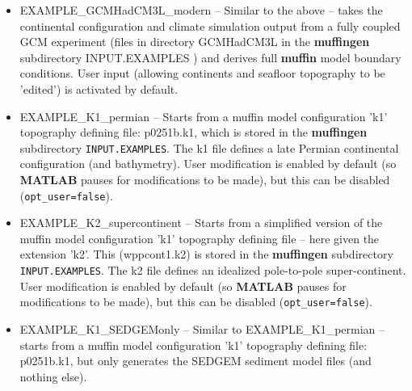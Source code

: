 \documentclass[11pt,fleqn]{book} %
\begin{document}
\begin{itemize}[noitemsep]
\vspace{1mm}
\item \textsf{\footnotesize EXAMPLE\_GCMHadCM3L\_modern} -- Similar to the above -- takes the continental configuration and climate simulation output from a fully coupled GCM experiment (files in directory \footnotesize\textsf{GCMHadCM3L }\normalsize in the \textbf{muffingen} subdirectory \footnotesize\textsf{INPUT.EXAMPLES }\normalsize) and derives full \textbf{muffin} model boundary conditions. User input (allowing continents and seafloor topography to be 'edited') is activated by default.

\vspace{1mm}
\item \textsf{\footnotesize EXAMPLE\_K1\_permian} -- Starts from a muffin model configuration 'k1' topography defining file: \textsf{\footnotesize p0251b.k1}, which is stored in the \textbf{muffingen} subdirectory \texttt{INPUT.EXAMPLES}. The k1 file defines a late Permian continental configuration (and bathymetry). User modification is enabled by default (so \textbf{MATLAB} pauses for modifications to be made), but this can be disabled (\texttt{opt\_user=false}).

\vspace{1mm}
\item \textsf{\footnotesize EXAMPLE\_K2\_supercontinent} -- Starts from a simplified version of the muffin model configuration 'k1' topography defining file -- here given  the extension 'k2'. This (\textsf{\footnotesize wppcont1.k2}) is stored in the \textbf{muffingen} subdirectory \texttt{INPUT.EXAMPLES}. The k2 file defines an idealized pole-to-pole super-continent. User modification is enabled by default (so \textbf{MATLAB} pauses for modifications to be made), but this can be disabled (\texttt{opt\_user=false}).

\vspace{1mm}
\item \textsf{\footnotesize EXAMPLE\_K1\_SEDGEMonly} -- Similar to \textsf{\footnotesize EXAMPLE\_K1\_permian} -- starts from a muffin model configuration 'k1' topography defining file: \textsf{\footnotesize p0251b.k1}, but only generates the SEDGEM sediment model files (and nothing else).


\end{itemize}
\end{document}
